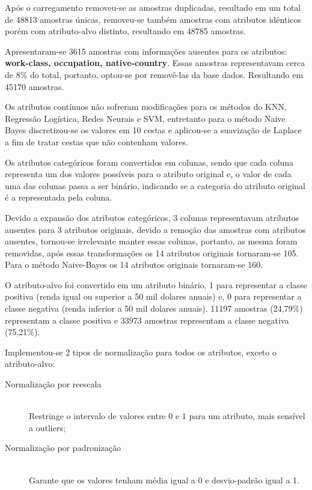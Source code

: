 Após o carregamento removeu-se as amostras duplicadas, resultado em um total de 48813 amostras únicas, removeu-se também amostras com atributos idênticos porém com atributo-alvo distinto, resultando em 48785 amostras.

Apresentaram-se 3615 amostras com informações ausentes para os atributos: \textbf{work-class, occupation, native-country}. Essas amostras representavam cerca de 8\% do total, portanto, optou-se por removê-las da base dados. Resultando em 45170 amostras.

Os atributos contínuos não sofreram modificações para os métodos do KNN, Regressão Logística, Redes Neurais e SVM, entretanto para o método Naive Bayes discretizou-se os valores em 10 cestas e aplicou-se a suavização de Laplace a fim de tratar cestas que não contenham valores.

Os atributos categóricos foram convertidos em colunas, sendo que cada coluna representa um dos valores possíveis para o atributo original e, o valor de cada uma das colunas passa a ser binário, indicando se a categoria do atributo original é a representada pela coluna. 

Devido a expansão dos atributos categóricos, 3 colunas representavam atributos ausentes para 3 atributos originais, devido a remoção das amostras com atributos ausentes, tornou-se irrelevante manter essas colunas, portanto, as mesma foram removidas, após essas transformações os 14 atributos originais tornaram-se 105.
Para o método Naive-Bayes os 14 atributos originais tornaram-se 160. 

O atributo-alvo foi convertido em um atributo binário, 1 para representar a classe positiva (renda igual ou superior a 50 mil dolares anuais) e, 0 para representar a classe negativa (renda inferior a 50 mil dolares anuais). 11197 amostras (24,79\%) representam a classe positiva e 33973 amostras representam a classe negativa (75,21\%).

Implementou-se 2 tipos de normalização para todos os atributos, exceto o atributo-alvo:

\begin{description}
\item[Normalização por reescala] \hfill \\ Restringe o intervalo de valores entre 0 e 1 para um atributo, mais sensível a outliers;
\item[Normalização por padronização] \hfill \\ Garante que os valores tenham média igual a 0 e desvio-padrão igual a 1.
\end{description}




